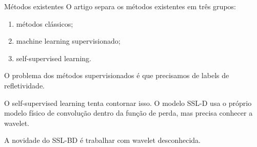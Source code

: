 \begin{frame}{Métodos existentes}
    O artigo separa os métodos existentes em três grupos:
    \begin{enumerate}
        \item métodos clássicos;
        \item machine learning supervisionado;
        \item self-supervised learning.
    \end{enumerate}
    O problema dos métodos supervisionados é que precisamos de labels de refletividade.

    O self-supervised learning tenta contornar isso. O modelo SSL-D usa o próprio modelo 
    físico de convolução dentro da função de perda, mas precisa conhecer a wavelet.

    A novidade do SSL-BD é trabalhar com wavelet desconhecida.
\end{frame}